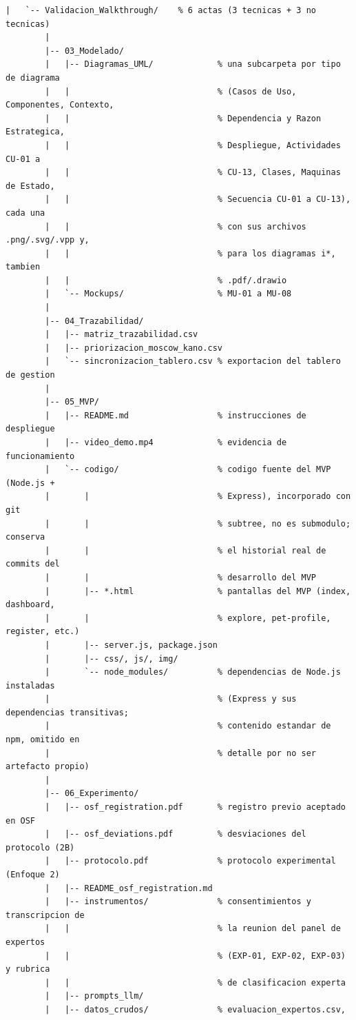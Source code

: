 \documentclass[journal,onecolumn]{IEEEtran}
\begin{document}
\begin{lstlisting}[style=csharp,caption={Estructura de carpetas del repositorio MundiPets-PFC-IngReq.},label={lst:estructura_repo}]
		|   `-- Validacion_Walkthrough/    % 6 actas (3 tecnicas + 3 no tecnicas)
		|
		|-- 03_Modelado/
		|   |-- Diagramas_UML/             % una subcarpeta por tipo de diagrama
		|   |                              % (Casos de Uso, Componentes, Contexto,
		|   |                              % Dependencia y Razon Estrategica,
		|   |                              % Despliegue, Actividades CU-01 a
		|   |                              % CU-13, Clases, Maquinas de Estado,
		|   |                              % Secuencia CU-01 a CU-13), cada una
		|   |                              % con sus archivos .png/.svg/.vpp y,
		|   |                              % para los diagramas i*, tambien
		|   |                              % .pdf/.drawio
		|   `-- Mockups/                   % MU-01 a MU-08
		|
		|-- 04_Trazabilidad/
		|   |-- matriz_trazabilidad.csv
		|   |-- priorizacion_moscow_kano.csv
		|   `-- sincronizacion_tablero.csv % exportacion del tablero de gestion
		|
		|-- 05_MVP/
		|   |-- README.md                  % instrucciones de despliegue
		|   |-- video_demo.mp4             % evidencia de funcionamiento
		|   `-- codigo/                    % codigo fuente del MVP (Node.js +
		|       |                          % Express), incorporado con git
		|       |                          % subtree, no es submodulo; conserva
		|       |                          % el historial real de commits del
		|       |                          % desarrollo del MVP
		|       |-- *.html                 % pantallas del MVP (index, dashboard,
		|       |                          % explore, pet-profile, register, etc.)
		|       |-- server.js, package.json
		|       |-- css/, js/, img/
		|       `-- node_modules/          % dependencias de Node.js instaladas
		|                                  % (Express y sus dependencias transitivas;
		|                                  % contenido estandar de npm, omitido en
		|                                  % detalle por no ser artefacto propio)
		|
		|-- 06_Experimento/
		|   |-- osf_registration.pdf       % registro previo aceptado en OSF
		|   |-- osf_deviations.pdf         % desviaciones del protocolo (2B)
		|   |-- protocolo.pdf              % protocolo experimental (Enfoque 2)
		|   |-- README_osf_registration.md
		|   |-- instrumentos/              % consentimientos y transcripcion de
		|   |                              % la reunion del panel de expertos
		|   |                              % (EXP-01, EXP-02, EXP-03) y rubrica
		|   |                              % de clasificacion experta
		|   |-- prompts_llm/
		|   |-- datos_crudos/              % evaluacion_expertos.csv,

\end{lstlisting}
\end{document}
